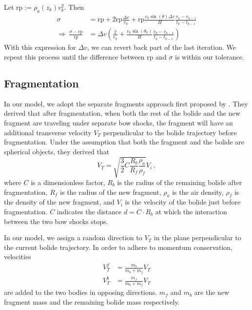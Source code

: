 Let $\mathrm{rp} := \rho_a(z_k)v_k^2$. Then
\begin{align*}
    \sigma &= \mathrm{rp} + 2\mathrm{rp}\frac{\Delta v}{v_k} + \mathrm{rp}\frac{v_k\sin(\theta)\Delta v}{H}\frac{v_k - v_{k-1}}{t_k - t_{k-1}} \\
    \Rightarrow\ \frac{\sigma - \mathrm{rp}}{\mathrm{rp}} &= \Delta v \left(\frac{2}{v_k} + \frac{v_k\sin(\theta_k)}{H}\frac{v_k - v_{k-1}}{t_k - t_{k-1}}\right)
\end{align*}
With this expression for $\Delta v$, we can revert back part of the last iteration. We repeat this process until the difference between $\mathrm{rp}$ and $\sigma$ is within our tolerance.

\subsection{Fragmentation}

In our model, we adopt the separate fragments approach first proposed by \cite{passey1980effects}.
They derived that after fragmentation, when both the rest of the bolide and the new fragment are traveling under separate bow shocks, 
the fragment will have an additional transverse velocity $V_T$ perpendicular to the bolide trajectory before fragmentation.
Under the assumption that both the fragment and the bolide are spherical objects,
they derived that
\begin{equation}
    V_T = \sqrt{\frac{3}{2}C\frac{R_b}{R_f}\frac{\rho_a}{\rho_f}}V_i\,,
    \label{eq:v_t}
\end{equation}
where $C$ is a dimensionless factor, $R_b$ is the radius of the remaining bolide after fragmentation,
$R_f$ is the radius of the new fragment, $\rho_a$ is the air density, $\rho_f$ is the density of the new fragment,
and $V_i$ is the velocity of the bolide just before fragmentation. $C$ indicates the distance $d = C\cdot R_b$ at which the interaction between the two bow shocks stops.

In our model, we assign a random direction to $V_T$ in the plane perpendicular to the current bolide trajectory.
In order to adhere to momentum conservation, velocities
\begin{align}
    V_T^f &= \frac{m_b}{m_b + m_f}V_T \\
    V_T^b &= \frac{m_f}{m_b + m_f}V_T
    \label{eq:v_t_star}
\end{align}
are added to the two bodies in opposing directions.
$m_f$ and $m_b$ are the new fragment mass and the remaining bolide mass respectively.

